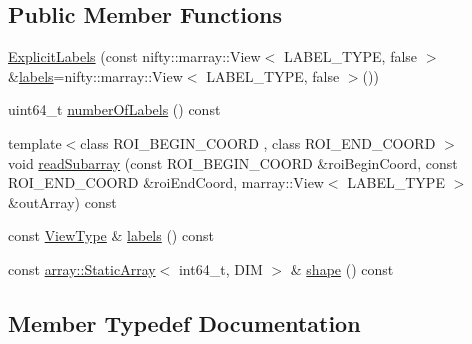 \subsection*{Public Member Functions}
\begin{DoxyCompactItemize}
\item 
\hyperlink{classnifty_1_1graph_1_1ExplicitLabels_ae503c70604d75e48d73622f8941cfa34}{Explicit\+Labels} (const nifty\+::marray\+::\+View$<$ L\+A\+B\+E\+L\+\_\+\+T\+Y\+P\+E, false $>$ \&\hyperlink{classnifty_1_1graph_1_1ExplicitLabels_a791af26bb936452324bf9e0b35521382}{labels}=nifty\+::marray\+::\+View$<$ L\+A\+B\+E\+L\+\_\+\+T\+Y\+P\+E, false $>$())
\item 
uint64\+\_\+t \hyperlink{classnifty_1_1graph_1_1ExplicitLabels_ac60baa565d760fbd0685b51440f0cae0}{number\+Of\+Labels} () const 
\item 
{\footnotesize template$<$class R\+O\+I\+\_\+\+B\+E\+G\+I\+N\+\_\+\+C\+O\+O\+R\+D , class R\+O\+I\+\_\+\+E\+N\+D\+\_\+\+C\+O\+O\+R\+D $>$ }\\void \hyperlink{classnifty_1_1graph_1_1ExplicitLabels_a546bc09065e24792dce4ae415dc04727}{read\+Subarray} (const R\+O\+I\+\_\+\+B\+E\+G\+I\+N\+\_\+\+C\+O\+O\+R\+D \&roi\+Begin\+Coord, const R\+O\+I\+\_\+\+E\+N\+D\+\_\+\+C\+O\+O\+R\+D \&roi\+End\+Coord, marray\+::\+View$<$ L\+A\+B\+E\+L\+\_\+\+T\+Y\+P\+E $>$ \&out\+Array) const 
\item 
const \hyperlink{classnifty_1_1graph_1_1ExplicitLabels_aaab98314403b95503bf0c32e65fd1884}{View\+Type} \& \hyperlink{classnifty_1_1graph_1_1ExplicitLabels_a791af26bb936452324bf9e0b35521382}{labels} () const 
\item 
const \hyperlink{namespacenifty_1_1array_a683f151f19c851754e0c6d55ed16a0c2}{array\+::\+Static\+Array}$<$ int64\+\_\+t, D\+I\+M $>$ \& \hyperlink{classnifty_1_1graph_1_1ExplicitLabels_a92c40e0451004610fa03feee065dd316}{shape} () const 
\end{DoxyCompactItemize}


\subsection{Member Typedef Documentation}
\hypertarget{classnifty_1_1graph_1_1ExplicitLabels_a896653b58048ec52d8e00800279d9b53}{}
